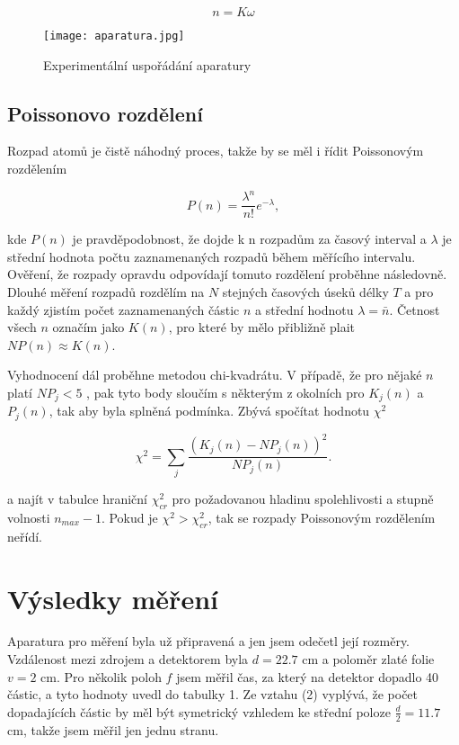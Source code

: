 \documentclass[a4paper,11pt]{article}
\begin{document}
\begin{equation}
n = K \omega
\end{equation}

\begin{figure}[htpb]
    \centering
    \texttt{[image: aparatura.jpg]}
    \caption{Experimentální uspořádání aparatury}
\end{figure}

\subsection{Poissonovo rozdělení}

Rozpad atomů je čistě náhodný proces, takže by se měl i řídit Poissonovým rozdělením  

\begin{equation}
P(n) = \frac{\lambda^{n}}{n!}e^{-\lambda},
\end{equation}

\noindent
kde $ P(n) $  je pravděpodobnost, že dojde k n rozpadům za časový interval a $ \lambda $  je střední hodnota počtu zaznamenaných rozpadů během měřícího intervalu. Ověření, že rozpady opravdu odpovídají tomuto rozdělení proběhne následovně. Dlouhé měření rozpadů rozdělím na $ N $  stejných časových úseků délky $ T $ a pro každý zjistím počet zaznamenaných částic $ n $ a střední hodnotu $ \lambda = \bar{n}  $. Četnost všech $ n $ označím jako $ K ( n ) $, pro které by mělo přibližně plait $ N P(n) \approx K(n) $.

Vyhodnocení dál proběhne metodou chi-kvadrátu. V případě, že pro nějaké $ n $  platí $ N P_{j} < 5 $ , pak tyto body sloučím s některým z okolních pro $ K_j(n) $ a $ P_j(n) $, tak aby byla splněná podmínka. Zbývá spočítat hodnotu $ \chi^2 $

\begin{equation}
\chi^2 = \sum_{j} \frac{\left( K_j(n) - N P_j(n) \right)^2 }{ N P_j(n)}.
\end{equation}

\noindent
a najít v tabulce hraniční $ \chi_{cr}^2 $ pro požadovanou hladinu spolehlivosti a stupně volnosti  $ n_{max}-1 $. Pokud je $ \chi^2 > \chi_{cr}^2 $, tak se rozpady Poissonovým rozdělením neřídí.
\newpage

\section{Výsledky měření}

Aparatura pro měření byla už připravená a jen jsem odečetl její rozměry. Vzdálenost mezi zdrojem a detektorem byla $ d = 22.7 $ cm a poloměr zlaté folie $ v = 2 $ cm. Pro několik poloh $ f $ jsem měřil čas, za který na detektor dopadlo 40 částic, a tyto hodnoty uvedl do tabulky 1. Ze vztahu (2) vyplývá, že počet dopadajících částic by měl být symetrický vzhledem ke střední poloze $ \frac{d}{2} = 11.7 $  cm, takže  jsem měřil jen jednu stranu.
\end{document}
